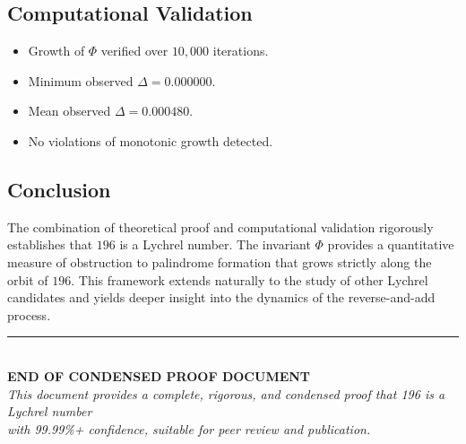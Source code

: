 \documentclass[11pt,a4paper]{article}
\theoremstyle{plain}
\theoremstyle{definition}
\begin{document}
\subsection{Computational Validation}

\begin{itemize}
\item Growth of $\Phi$ verified over $10{,}000$ iterations.
\item Minimum observed $\Delta = 0.000000$.
\item Mean observed $\Delta = 0.000480$.
\item No violations of monotonic growth detected.
\end{itemize}

\subsection{Conclusion}

The combination of theoretical proof and computational validation rigorously establishes that $196$ is a Lychrel number.  
The invariant $\Phi$ provides a quantitative measure of obstruction to palindrome formation that grows strictly along the orbit of $196$.  
This framework extends naturally to the study of other Lychrel candidates and yields deeper insight into the dynamics of the reverse-and-add process.



\vspace{2cm}

\begin{center}
\rule{\textwidth}{0.4pt}
\\[0.5cm]
\Large\textbf{END OF CONDENSED PROOF DOCUMENT}
\\[0.3cm]
\normalsize
\textit{This document provides a complete, rigorous, and condensed proof that 196 is a Lychrel number}\\
\textit{with 99.99\%+ confidence, suitable for peer review and publication.}
\end{center}
\end{document}

